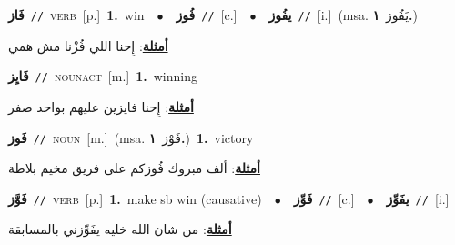 \documentclass[10pt,a4paper,twoside]{article} %
\begin{document}
\begin{multicols}{2}
{\setlength\topsep{0pt}\textbf{\foreignlanguage{arabic}{فَاز}}\ {\color{gray}\texttt{//}\color{black}}\ \textsc{verb}\ [p.]\ \textbf{1.}~win\ \ $\bullet$\ \ \setlength\topsep{0pt}\textbf{\foreignlanguage{arabic}{فُوز}}\ {\color{gray}\texttt{//}\color{black}}\ [c.]\ \ $\bullet$\ \ \setlength\topsep{0pt}\textbf{\foreignlanguage{arabic}{يفُوز}}\ {\color{gray}\texttt{//}\color{black}}\ [i.]\ \color{gray}(msa. \foreignlanguage{arabic}{يَفُوز}~\foreignlanguage{arabic}{\textbf{١.}})\color{black}\  \begin{flushright}\color{gray}\foreignlanguage{arabic}{\textbf{\underline{\foreignlanguage{arabic}{أمثلة}}}: إِحنا اللي فُزْنا مش همي}\end{flushright}\color{black}} \vspace{2mm}

{\setlength\topsep{0pt}\textbf{\foreignlanguage{arabic}{فَايِز}}\ {\color{gray}\texttt{//}\color{black}}\ \textsc{noun\textunderscore act}\ [m.]\ \textbf{1.}~winning\  \begin{flushright}\color{gray}\foreignlanguage{arabic}{\textbf{\underline{\foreignlanguage{arabic}{أمثلة}}}: إِحنا فايزين عليهم بواحد صفر}\end{flushright}\color{black}} \vspace{2mm}

{\setlength\topsep{0pt}\textbf{\foreignlanguage{arabic}{فَوز}}\ {\color{gray}\texttt{//}\color{black}}\ \textsc{noun}\ [m.]\ \color{gray}(msa. \foreignlanguage{arabic}{فَوْز}~\foreignlanguage{arabic}{\textbf{١.}})\color{black}\ \textbf{1.}~victory\  \begin{flushright}\color{gray}\foreignlanguage{arabic}{\textbf{\underline{\foreignlanguage{arabic}{أمثلة}}}: ألف مبروك فُوزكم على فريق مخيم بلاطة}\end{flushright}\color{black}} \vspace{2mm}

{\setlength\topsep{0pt}\textbf{\foreignlanguage{arabic}{فَوَّز}}\ {\color{gray}\texttt{//}\color{black}}\ \textsc{verb}\ [p.]\ \textbf{1.}~make sb win (causative)\ \ $\bullet$\ \ \setlength\topsep{0pt}\textbf{\foreignlanguage{arabic}{فَوِّز}}\ {\color{gray}\texttt{//}\color{black}}\ [c.]\ \ $\bullet$\ \ \setlength\topsep{0pt}\textbf{\foreignlanguage{arabic}{يفَوِّز}}\ {\color{gray}\texttt{//}\color{black}}\ [i.]\  \begin{flushright}\color{gray}\foreignlanguage{arabic}{\textbf{\underline{\foreignlanguage{arabic}{أمثلة}}}: من شان الله خليه يفَوِّزني بالمسابقة}\end{flushright}\color{black}} \vspace{2mm}


\end{multicols}
\end{document}
